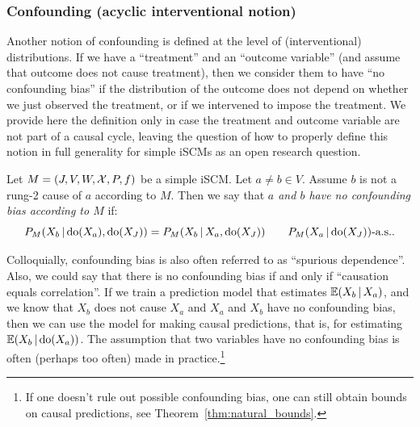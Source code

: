 \subsubsection{Confounding (acyclic interventional notion)}

Another notion of confounding is defined at the level of (interventional) distributions.
If we have a ``treatment'' and an ``outcome variable'' (and assume that outcome does not cause treatment), then we consider them to have ``no confounding bias'' if the distribution of the outcome does not depend on whether we just observed the treatment, or if we intervened to impose the treatment.
We provide here the definition only in case the treatment and outcome variable are not part of a causal cycle, leaving the question of how to properly define this notion in full generality for simple iSCMs as an open research question.
\begin{Def}\label{def:no_confounding_bias}
  Let $M = \left ( J, V, W, \mathcal{X}, P, f \right )$ be a simple iSCM.
  Let $a \ne b \in V$.
  Assume $b$ is not a rung-2 cause of $a$ according to $M$.
  Then we say that \emph{$a$ and $b$ have no confounding bias according to $M$} if:
  \begin{equation}\label{eq:no_confounding_bias}
    P_{M}(X_b \operatorname*{|} \operatorname{do}(X_a), \operatorname{do}(X_J)) = P_{M}(X_b \operatorname*{|} X_a, \operatorname{do}(X_J)) \qquad P_M(X_a \operatorname*{|} \operatorname{do}(X_J))\text{-a.s.}.
  \end{equation}
\end{Def}
Colloquially, confounding bias is also often referred to as ``spurious dependence''.
Also, we could say that there is no confounding bias if and only if ``causation equals correlation''.
If we train a prediction model that estimates $\mathbb{E}(X_b \operatorname*{|} X_a)$, and we know that $X_b$ does not cause $X_a$ and $X_a$ and $X_b$ have no confounding bias, then we can use the model for making causal predictions, that is, for estimating $\mathbb{E}(X_b \operatorname*{|} \operatorname{do}(X_a))$.
The assumption that two variables have no confounding bias is often (perhaps too often) made in practice.\footnote{If one doesn't rule out possible confounding bias, one can still obtain bounds on causal predictions, see Theorem~\ref{thm:natural_bounds}.}
